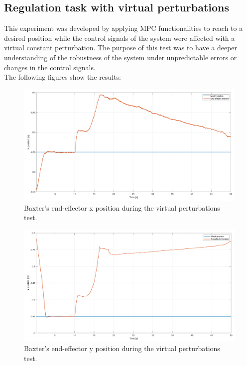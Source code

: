 \documentclass[11pt]{report} %
\begin{document}
\subsection{Regulation task with virtual perturbations}

This experiment was developed by applying MPC functionalities to reach to a desired position while the control signals of the system were affected with a virtual constant perturbation. The purpose of this test was to have a deeper understanding of the robustness of the system under unpredictable errors or changes in the control signals.\\

The following figures show the results:

\begin{figure}[H]
    \centering
    \includegraphics[width=1.0\linewidth]{assets/imgs/control_theory/mpc_regulation_virtual_perturbations/x_pose.png}
    \caption{Baxter's end-effector x position during the virtual perturbations test.} 
    \label{fig_baxter_x_pose_mpc_virtual_perturbations_experiments}
\end{figure}

\begin{figure}[H]
    \centering
    \includegraphics[width=1.0\linewidth]{assets/imgs/control_theory/mpc_regulation_virtual_perturbations/y_pose.png}
    \caption{Baxter's end-effector y position during the virtual perturbations test.} 
    \label{fig_baxter_y_pose_mpc_virtual_perturbations_experiments}
\end{figure}
\end{document}
